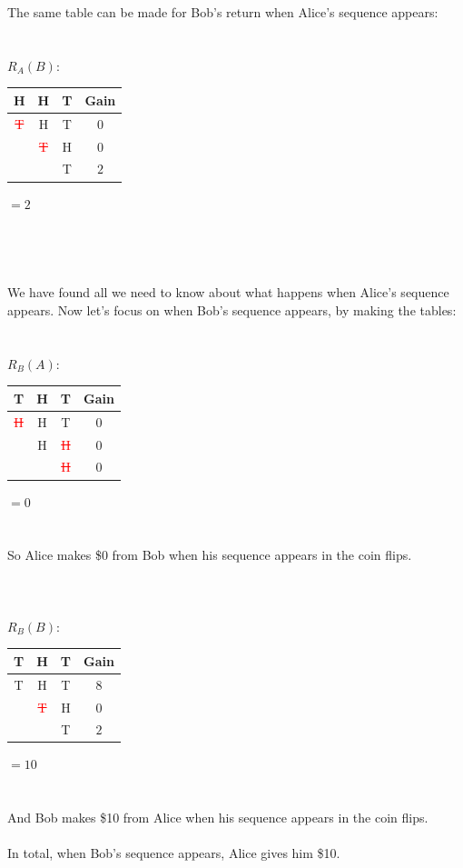 \documentclass[english,12pt,a4paper,final]{article}
\begin{document}
The same table can be made for Bob's return when Alice's sequence appears:
\\\\\\
$R_A(B)$:
\begin{tabular}{|ccc|c|}
	\hline
	H & H & T & Gain \\
	\hline
	
	\textcolor{red}{\sout{T}} & H & T & $0$ \\
	
	& \textcolor{red}{\sout{T}} & H & $0$ \\
	
	&  & \textcolor{OliveGreen}{T} & $2$ \\
	\hline
\end{tabular}
$=2$
\\\\\\\\\\
We have found all we need to know about what happens when Alice's sequence appears. Now let's focus on when Bob's sequence appears, by making the tables:
\\\\\\
$R_B(A)$:
\begin{tabular}{|ccc|c|}
	\hline
	T & H & T & Gain \\
	\hline
	
	\textcolor{red}{\sout{H}} & H & T & $0$ \\
	
	& \textcolor{OliveGreen}{H} & \textcolor{red}{\sout{H}} & $0$ \\
	
	&  & \textcolor{red}{\sout{H}} & $0$ \\
	\hline
\end{tabular}
$=0$
\\\\\\
So Alice makes \$0 from Bob when his sequence appears in the coin flips.
\\\\\\\\

$R_B(B)$:
\begin{tabular}{|ccc|c|}
	\hline
	T & H & T & Gain \\
	\hline
	
	\textcolor{OliveGreen}{T} & \textcolor{OliveGreen}{H} & \textcolor{OliveGreen}{T} & $8$ \\
	
	& \textcolor{red}{\sout{T}} & H & $0$ \\
	
	&  & \textcolor{OliveGreen}{T} & $2$ \\
	\hline
\end{tabular}
$=10$
\\\\\\
And Bob makes \$10 from Alice when his sequence appears in the coin flips.
\\\\
In total, when Bob's sequence appears, Alice gives him \$10.
\end{document}
